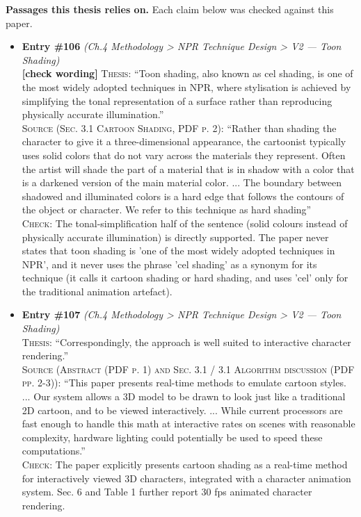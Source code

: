 \documentclass[11pt, a4paper]{article}
\begin{document}
\textbf{Passages this thesis relies on.} Each claim below was checked against this paper.
\begin{itemize}[leftmargin=1.2em,itemsep=4pt]
\item \textbf{Entry \#106} \textit{(Ch.4 Methodology > NPR Technique Design > V2 — Toon Shading)}\\
\textcolor{partialorange}{\textbf{[check wording]}} \textsc{Thesis:} ``Toon shading, also known as cel shading, is one of the most widely adopted techniques in NPR, where stylisation is achieved by simplifying the tonal representation of a surface rather than reproducing physically accurate illumination.''\\
\textsc{Source (Sec. 3.1 Cartoon Shading, PDF p. 2):} ``Rather than shading the character to give it a three-dimensional appearance, the cartoonist typically uses solid colors that do not vary across the materials they represent. Often the artist will shade the part of a material that is in shadow with a color that is a darkened version of the main material color. ... The boundary between shadowed and illuminated colors is a hard edge that follows the contours of the object or character. We refer to this technique as hard shading''\\
\textsc{Check:} The tonal-simplification half of the sentence (solid colours instead of physically accurate illumination) is directly supported. The paper never states that toon shading is 'one of the most widely adopted techniques in NPR', and it never uses the phrase 'cel shading' as a synonym for its technique (it calls it cartoon shading or hard shading, and uses 'cel' only for the traditional animation artefact).
\item \textbf{Entry \#107} \textit{(Ch.4 Methodology > NPR Technique Design > V2 — Toon Shading)}\\
\textsc{Thesis:} ``Correspondingly, the approach is well suited to interactive character rendering.''\\
\textsc{Source (Abstract (PDF p. 1) and Sec. 3.1 / 3.1 Algorithm discussion (PDF pp. 2-3)):} ``This paper presents real-time methods to emulate cartoon styles. ... Our system allows a 3D model to be drawn to look just like a traditional 2D cartoon, and to be viewed interactively. ... While current processors are fast enough to handle this math at interactive rates on scenes with reasonable complexity, hardware lighting could potentially be used to speed these computations.''\\
\textsc{Check:} The paper explicitly presents cartoon shading as a real-time method for interactively viewed 3D characters, integrated with a character animation system. Sec. 6 and Table 1 further report 30 fps animated character rendering.

\end{itemize}
\end{document}
